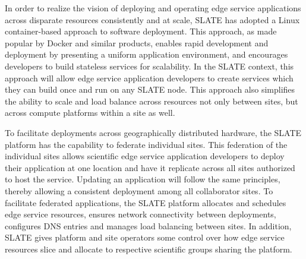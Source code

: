 \documentclass[sigconf]{acmart}
\begin{document}
In order to realize the vision of deploying and operating edge service applications across disparate resources consistently and at scale, SLATE has adopted a Linux container-based approach to software deployment. This approach, as made popular by Docker and similar products, enables rapid development and deployment by presenting a uniform application environment, and encourages developers to build stateless services for scalability. In the SLATE context, this approach will allow edge service application developers to create services which they can build once and run on any SLATE node.  This approach also simplifies the ability to scale and load balance across resources not only between sites, but across compute platforms within a site as well. 

To facilitate deployments across geographically distributed hardware, the SLATE platform has the capability to federate individual sites. This federation of the individual sites allows scientific edge service application developers to deploy their application at one location and have it replicate across all sites authorized to host the service. Updating an application will follow the same principles, thereby allowing a consistent deployment among all collaborator sites. To facilitate federated applications, the SLATE platform allocates and schedules edge service resources, ensures network connectivity between deployments, configures DNS entries and manages load balancing between sites. In addition, SLATE gives platform and site operators some control over how edge service resources slice and allocate to respective scientific groups sharing the platform. 



\end{document}

